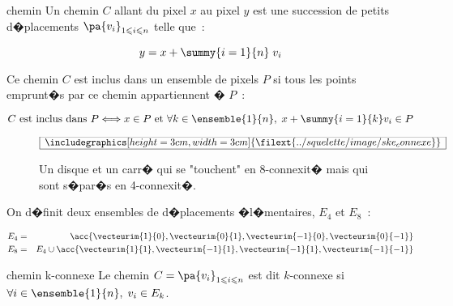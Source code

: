         \begin{xdefinition}{chemin}
        Un chemin $C$ allant du pixel $x$ au pixel $y$ est une succession de petits d�placements 
        $\pa{v_i}_{1 \leqslant i \leqslant n}$ telle que~:
        
                $$
                y = x + \summy{i=1}{n} \; v_i
                $$
                
        Ce chemin $C$ est inclus dans un ensemble de pixels $P$ si tous les points emprunt�s par 
        ce chemin appartiennent � $P$~:
        
                $$
                C \text{ est inclus dans } P \Longleftrightarrow     x \in P \text{ et } 
                                                                                                                    \forall k \in \ensemble{1}{n}, \; 
                                                                                                                    x + \summy{i=1}{k} v_i \in P
                $$
                
        \end{xdefinition}


            \begin{figure}[ht]
        $$\frame{$\begin{array}[c]{c}\includegraphics[height=3cm, width=3cm]
        {\filext{../squelette/image/ske_connexe}}\end{array}$}$$
        \caption{    Un disque et un carr� qui se "touchent" en 8-connexit� mais qui sont s�par�s en 4-connexit�.}
        \label{squelette_connexe48}
            \end{figure}


On d�finit deux ensembles de d�placements �l�mentaires, $E_4$ et $E_8$~:

        \begin{eqnarray*}
        E_4     &=&        \acc{ \vecteurim{1}{0}, \vecteurim{0}{1}, \vecteurim{-1}{0}, \vecteurim{0}{-1}   } \\
        E_8     &=&        E_4 \cup \acc{ \vecteurim{1}{1}, \vecteurim{-1}{1}, \vecteurim{-1}{1}, \vecteurim{-1}{-1}   } 
        \end{eqnarray*}


        \begin{xdefinition}{chemin k-connexe}
        Le chemin $C= \pa{v_i}_{1 \leqslant i \leqslant n}$ est dit $k$-connexe 
        si $\forall i \in \ensemble{1}{n}, \; v_i \in E_k$. 
        \end{xdefinition}

